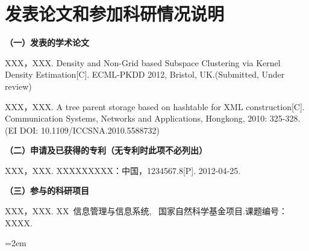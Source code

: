 

\chapter*{发表论文和参加科研情况说明}
\setlength{\parindent}{0em}
\textbf{（一）发表的学术论文}
\begin{publist}
\item XXX，XXX. Density and Non-Grid based Subspace Clustering via Kernel Density Estimation[C]. ECML-PKDD 2012, Bristol, UK.(Submitted, Under review)
\item XXX，XXX. A tree parent storage based on hashtable for XML construction[C]. Communication Systems, Networks and Applications, Hongkong, 2010: 325-328. (EI DOI: 10.1109/ICCSNA.2010.5588732)
\end{publist}

\vspace*{1em}
\textbf{（二）申请及已获得的专利（无专利时此项不必列出）}
\begin{publist}
\item XXX，XXX. XXXXXXXXX：中国，1234567.8[P]. 2012-04-25.
\end{publist}
\vspace*{1em}
\textbf{（三）参与的科研项目}
\begin{publist}
\item	XXX，XXX. XX~信息管理与信息系统, ~国家自然科学基金项目.课题编号：XXXX.
\end{publist}
\vfill
{}\hangindent=2em\noindent

\setlength{\parindent}{2em}
